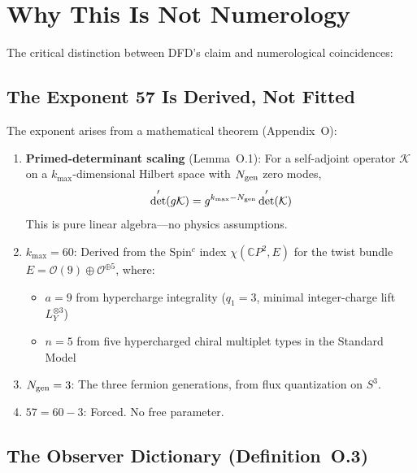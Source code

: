 \documentclass[11pt]{article}
\begin{document}
\section{Why This Is Not Numerology}

The critical distinction between DFD's claim and numerological coincidences:

\subsection{The Exponent 57 Is Derived, Not Fitted}

The exponent arises from a mathematical theorem (Appendix~O):
\begin{enumerate}
\item \textbf{Primed-determinant scaling} (Lemma~O.1): For a self-adjoint operator
$\mathcal{K}$ on a $k_{\max}$-dimensional Hilbert space with $N_{\rm gen}$ zero modes,
\begin{equation}
\det'(g\mathcal{K}) = g^{k_{\max} - N_{\rm gen}} \det'(\mathcal{K})
\end{equation}
This is pure linear algebra---no physics assumptions.

\item \textbf{$k_{\max} = 60$}: Derived from the Spin$^c$ index $\chi(\mathbb{C}P^2, E)$ for
the twist bundle $E = \mathcal{O}(9) \oplus \mathcal{O}^{\oplus 5}$, where:
\begin{itemize}
\item $a = 9$ from hypercharge integrality ($q_1 = 3$, minimal integer-charge lift
$L_Y^{\otimes 3}$)
\item $n = 5$ from five hypercharged chiral multiplet types in the Standard Model
\end{itemize}

\item \textbf{$N_{\rm gen} = 3$}: The three fermion generations, from flux quantization on $S^3$.

\item \textbf{$57 = 60 - 3$}: Forced. No free parameter.
\end{enumerate}

\subsection{The Observer Dictionary (Definition~O.3)}
\end{document}
